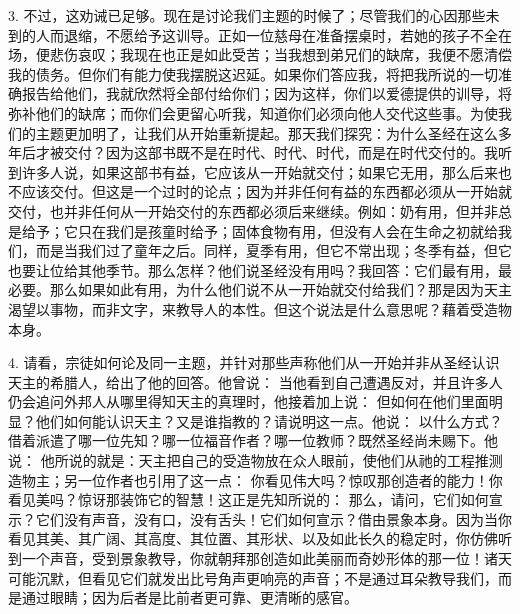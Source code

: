 3. 不过，这劝诫已足够。现在是讨论我们主题的时候了；尽管我们的心因那些未到的人而退缩，不愿给予这训导。正如一位慈母在准备摆桌时，若她的孩子不全在场，便悲伤哀叹；我现在也正是如此受苦；当我想到弟兄们的缺席，我便不愿清偿我的债务。但你们有能力使我摆脱这迟延。如果你们答应我，将把我所说的一切准确报告给他们，我就欣然将全部付给你们；因为这样，你们以爱德提供的训导，将弥补他们的缺席；而你们会更留心听我，知道你们必须向他人交代这些事。为使我们的主题更加明了，让我们从开始重新提起。那天我们探究：为什么圣经在这么多年后才被交付？因为这部书既不是在时代、时代、时代，而是在时代交付的。我听到许多人说，如果这部书有益，它应该从一开始就交付；如果它无用，那么后来也不应该交付。但这是一个过时的论点；因为并非任何有益的东西都必须从一开始就交付，也并非任何从一开始交付的东西都必须后来继续。例如：奶有用，但并非总是给予；它只在我们是孩童时给予；固体食物有用，但没有人会在生命之初就给我们，而是当我们过了童年之后。同样，夏季有用，但它不常出现；冬季有益，但它也要让位给其他季节。那么怎样？他们说圣经没有用吗？我回答：它们最有用，最必要。那么如果如此有用，为什么他们说不从一开始就交付给我们？那是因为天主渴望以事物，而非文字，来教导人的本性。但这个说法是什么意思呢？藉着受造物本身。\par

4. 请看，宗徒如何论及同一主题，并针对那些声称他们从一开始并非从圣经认识天主的希腊人，给出了他的回答。他曾说： 当他看到自己遭遇反对，并且许多人仍会追问外邦人从哪里得知天主的真理时，他接着加上说： 但如何在他们里面明显？他们如何能认识天主？又是谁指教的？请说明这一点。他说： 以什么方式？借着派遣了哪一位先知？哪一位福音作者？哪一位教师？既然圣经尚未赐下。他说： 他所说的就是：天主把自己的受造物放在众人眼前，使他们从祂的工程推测造物主；另一位作者也引用了这一点： 你看见伟大吗？惊叹那创造者的能力！你看见美吗？惊讶那装饰它的智慧！这正是先知所说的： 那么，请问，它们如何宣示？它们没有声音，没有口，没有舌头！它们如何宣示？借由景象本身。因为当你看见其美、其广阔、其高度、其位置、其形状、以及如此长久的稳定时，你仿佛听到一个声音，受到景象教导，你就朝拜那创造如此美丽而奇妙形体的那一位！诸天可能沉默，但看见它们就发出比号角声更响亮的声音；不是通过耳朵教导我们，而是通过眼睛；因为后者是比前者更可靠、更清晰的感官。\par

